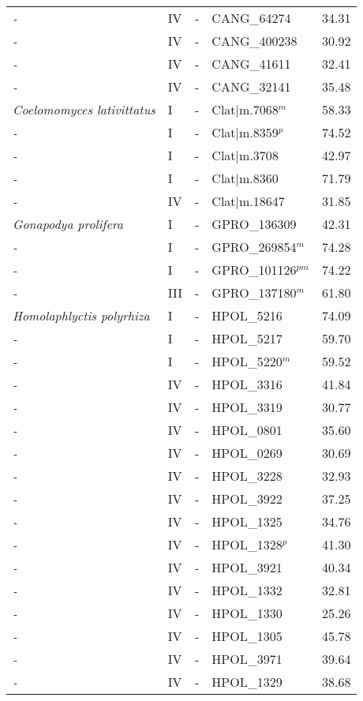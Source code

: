{{\begin{longtable}{llllr}
  \emph{-} & IV & - & CANG\_64274 & 34.31 \\ 
  \emph{-} & IV & - & CANG\_400238 & 30.92 \\ 
  \emph{-} & IV & - & CANG\_41611 & 32.41 \\ 
  \emph{-} & IV & - & CANG\_32141 & 35.48 \\ 
  \emph{Coelomomyces lativittatus} & I & - & Clat|m.7068$^{m}$ & 58.33 \\ 
  \emph{-} & I & - & Clat|m.8359$^{p}$ & 74.52 \\ 
  \emph{-} & I & - & Clat|m.3708 & 42.97 \\ 
  \emph{-} & I & - & Clat|m.8360 & 71.79 \\ 
  \emph{-} & IV & - & Clat|m.18647 & 31.85 \\ 
  \emph{Gonapodya prolifera } & I & - & GPRO\_136309 & 42.31 \\ 
  \emph{-} & I & - & GPRO\_269854$^{m}$ & 74.28 \\ 
  \emph{-} & I & - & GPRO\_101126$^{pm}$ & 74.22 \\ 
  \emph{-} & III & - & GPRO\_137180$^{m}$ & 61.80 \\ 
  \emph{Homolaphlyctis polyrhiza} & I & - & HPOL\_5216 & 74.09 \\ 
  \emph{-} & I & - & HPOL\_5217 & 59.70 \\ 
  \emph{-} & I & - & HPOL\_5220$^{m}$ & 59.52 \\ 
  \emph{-} & IV & - & HPOL\_3316 & 41.84 \\ 
  \emph{-} & IV & - & HPOL\_3319 & 30.77 \\ 
  \emph{-} & IV & - & HPOL\_0801 & 35.60 \\ 
  \emph{-} & IV & - & HPOL\_0269 & 30.69 \\ 
  \emph{-} & IV & - & HPOL\_3228 & 32.93 \\ 
  \emph{-} & IV & - & HPOL\_3922 & 37.25 \\ 
  \emph{-} & IV & - & HPOL\_1325 & 34.76 \\ 
  \emph{-} & IV & - & HPOL\_1328$^{p}$ & 41.30 \\ 
  \emph{-} & IV & - & HPOL\_3921 & 40.34 \\ 
  \emph{-} & IV & - & HPOL\_1332 & 32.81 \\ 
  \emph{-} & IV & - & HPOL\_1330 & 25.26 \\ 
  \emph{-} & IV & - & HPOL\_1305 & 45.78 \\ 
  \emph{-} & IV & - & HPOL\_3971 & 39.64 \\ 
  \emph{-} & IV & - & HPOL\_1329 & 38.68 \\ 

\end{longtable}}}
